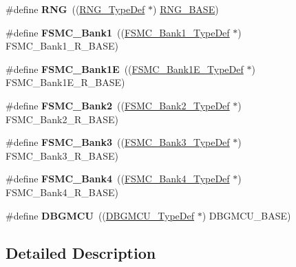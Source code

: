 \begin{DoxyCompactItemize}
\item 
\#define {\bfseries R\+NG}~((\hyperlink{struct_r_n_g___type_def}{R\+N\+G\+\_\+\+Type\+Def} $\ast$) \hyperlink{group___peripheral__memory__map_gab92662976cfe62457141e5b4f83d541c}{R\+N\+G\+\_\+\+B\+A\+SE})\hypertarget{group___peripheral__declaration_ga5b0885b8b55bbc13691092b704d9309f}{}\label{group___peripheral__declaration_ga5b0885b8b55bbc13691092b704d9309f}

\item 
\#define {\bfseries F\+S\+M\+C\+\_\+\+Bank1}~((\hyperlink{struct_f_s_m_c___bank1___type_def}{F\+S\+M\+C\+\_\+\+Bank1\+\_\+\+Type\+Def} $\ast$) F\+S\+M\+C\+\_\+\+Bank1\+\_\+\+R\+\_\+\+B\+A\+SE)\hypertarget{group___peripheral__declaration_ga2a759bad07fe730c99f9e1490e646220}{}\label{group___peripheral__declaration_ga2a759bad07fe730c99f9e1490e646220}

\item 
\#define {\bfseries F\+S\+M\+C\+\_\+\+Bank1E}~((\hyperlink{struct_f_s_m_c___bank1_e___type_def}{F\+S\+M\+C\+\_\+\+Bank1\+E\+\_\+\+Type\+Def} $\ast$) F\+S\+M\+C\+\_\+\+Bank1\+E\+\_\+\+R\+\_\+\+B\+A\+SE)\hypertarget{group___peripheral__declaration_ga422986101f42a8811ae89ac69deb2759}{}\label{group___peripheral__declaration_ga422986101f42a8811ae89ac69deb2759}

\item 
\#define {\bfseries F\+S\+M\+C\+\_\+\+Bank2}~((\hyperlink{struct_f_s_m_c___bank2___type_def}{F\+S\+M\+C\+\_\+\+Bank2\+\_\+\+Type\+Def} $\ast$) F\+S\+M\+C\+\_\+\+Bank2\+\_\+\+R\+\_\+\+B\+A\+SE)\hypertarget{group___peripheral__declaration_gabb3dfb5e88694aa2983ecabd33a55e0a}{}\label{group___peripheral__declaration_gabb3dfb5e88694aa2983ecabd33a55e0a}

\item 
\#define {\bfseries F\+S\+M\+C\+\_\+\+Bank3}~((\hyperlink{struct_f_s_m_c___bank3___type_def}{F\+S\+M\+C\+\_\+\+Bank3\+\_\+\+Type\+Def} $\ast$) F\+S\+M\+C\+\_\+\+Bank3\+\_\+\+R\+\_\+\+B\+A\+SE)\hypertarget{group___peripheral__declaration_ga411eedc00b5b2b22b494004d4f41b736}{}\label{group___peripheral__declaration_ga411eedc00b5b2b22b494004d4f41b736}

\item 
\#define {\bfseries F\+S\+M\+C\+\_\+\+Bank4}~((\hyperlink{struct_f_s_m_c___bank4___type_def}{F\+S\+M\+C\+\_\+\+Bank4\+\_\+\+Type\+Def} $\ast$) F\+S\+M\+C\+\_\+\+Bank4\+\_\+\+R\+\_\+\+B\+A\+SE)\hypertarget{group___peripheral__declaration_ga5aa00e4ac522693c6a21bc23ef5a96df}{}\label{group___peripheral__declaration_ga5aa00e4ac522693c6a21bc23ef5a96df}

\item 
\#define {\bfseries D\+B\+G\+M\+CU}~((\hyperlink{struct_d_b_g_m_c_u___type_def}{D\+B\+G\+M\+C\+U\+\_\+\+Type\+Def} $\ast$) D\+B\+G\+M\+C\+U\+\_\+\+B\+A\+SE)\hypertarget{group___peripheral__declaration_ga92ec6d9ec2251fda7d4ce09748cd74b4}{}\label{group___peripheral__declaration_ga92ec6d9ec2251fda7d4ce09748cd74b4}

\end{DoxyCompactItemize}


\subsection{Detailed Description}
